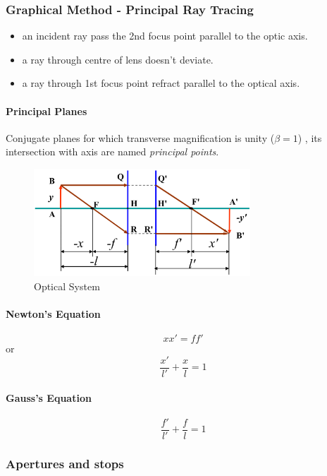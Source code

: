 \subsubsection{Graphical Method - Principal Ray Tracing}
\begin{itemize}
  \item an incident ray pass the 2nd focus point parallel to the optic axis.
  \item a ray through centre of lens doesn't deviate.
  \item a ray through 1st focus point refract parallel to the optical axis.
\end{itemize}

\paragraph{Principal Planes} Conjugate planes for which transverse magnification is unity ($\beta=1
$) , its intersection with axis are named \emph{principal points}.

\begin{figure}
  \centering
  \includegraphics[width=3.2in]{fig/newtons_equation.png}
  \caption{Optical System}\label{fig_newtons_equation}
\end{figure}

\paragraph{Newton's Equation}

$$xx' =ff'$$ or $$\frac{x'}{l'}+\frac{x}{l} = 1$$

\paragraph{Gauss's Equation}

$$\frac{f'}{l'}+\frac{f}{l}=1$$

\subsubsection{Apertures and stops}

